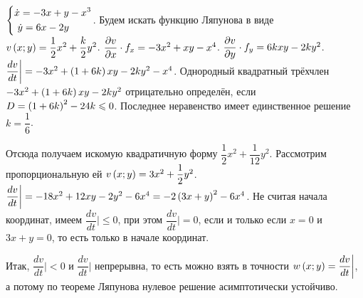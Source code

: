 \documentclass[a5paper,10pt]{article}
\begin{document}
$\left\{ \begin{aligned}& \dot{x} = -3x + y - x^3 \\&\ \dot{y} = 6x - 2y\end{aligned} \right.$. Будем искать функцию Ляпунова в виде $v\left(x; y\right) = \dfrac {1} {2} x^2 + \dfrac {k} {2} y^2 $. 
$\dfrac{\partial v}{\partial x} \cdot f_{x} = -3x^{2} + xy - x^{4}$.
$\dfrac{\partial v}{\partial y} \cdot f_{y} = 6kxy - 2ky^2$.
$\dfrac{dv}{dt}\bigg| = -3x^2 + \left(1 + 6k\right) xy - 2ky^2 - x^4$.
Однородный квадратный трёхчлен $-3x^2 + \left(1 + 6k\right) xy - 2ky^2$ отрицательно определён, если $D = \left(1 + 6k\right)^2 - 24k \leqslant 0$. Последнее неравенство имеет единственное решение $k = \dfrac {1} {6}$.

Отсюда получаем искомую квадратичную форму $\dfrac {1} {2} x^2 + \dfrac {1} {12} y^2 $. Рассмотрим пропорциональную ей $v\left(x; y\right) = 3x^2 + \dfrac {1} {2}y^2$. $\dfrac{dv}{dt}\bigg| = -18 x^2 + 12 xy - 2y^2 - 6x^4 = -2 \left(3x + y\right)^2 - 6x^4$. Не считая начала координат, имеем $\dfrac{dv}{dt}\bigg| \le 0$, при этом $\dfrac{dv}{dt}\bigg| = 0$, если и только если $x = 0$ и $3x + y = 0$, то есть только в начале координат.

Итак, $\dfrac{dv}{dt}\bigg| < 0$ и $\dfrac{dv}{dt}\bigg|$ непрерывна, то есть можно взять в точности $w\left(x; y\right) = \dfrac{dv}{dt}\bigg|$, а потому по теореме Ляпунова нулевое решение асимптотически устойчиво.
\end{document}
